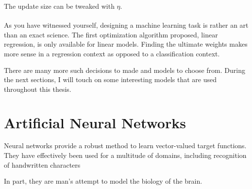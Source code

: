 The update size can be tweaked with $\eta$.

\paragraph{}
As you have witnessed yourself,
designing a machine learning task
is rather an art than an exact science.
The first optimization algorithm proposed,
linear regression,
is only available for linear models.
Finding the ultimate weights
makes more sense in a regression context
as opposed to a classification context.

There are many more such decisions to made
and models to choose from.
During the next sections,
I will touch on some interesting
models that are used throughout this thesis.


\section{Artificial Neural Networks}
Neural networks provide a robust method to learn
vector-valued target functions.
They have effectively been used for a multitude of domains,
including recognition of handwritten characters


In part, they are man's attempt
to model the biology of the brain.